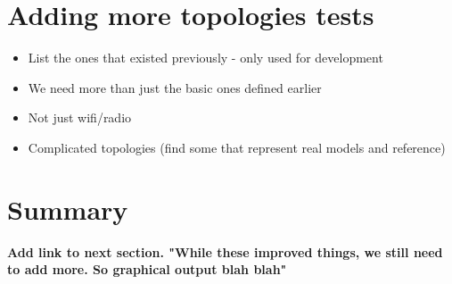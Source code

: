 \section{Adding more topologies tests}
\begin{itemize}
    \item List the ones that existed previously - only used for development
    \item We need more than just the basic ones defined earlier
    \item Not just wifi/radio
    \item Complicated topologies (find some that represent real models and reference)
\end{itemize}

\section{Summary}
\textbf{Add link to next section. "While these improved things, we still need to add more. So graphical output blah blah"}